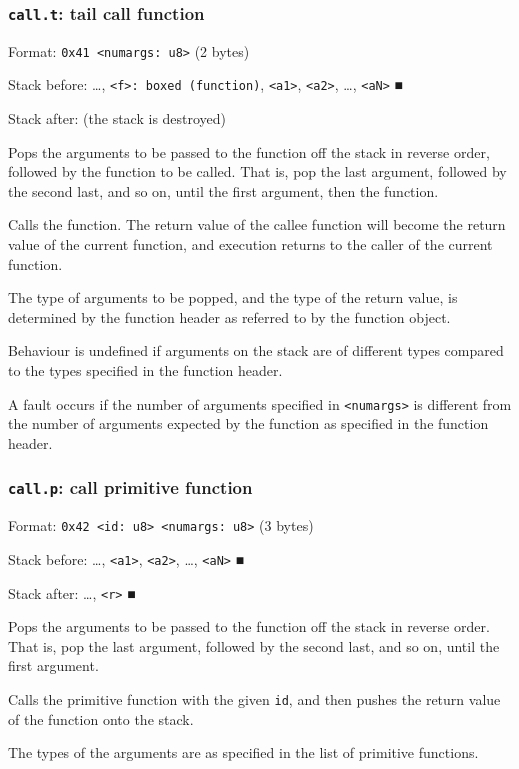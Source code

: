 \subsubsection{\texttt{call.t}: tail call function}
\label{sec:org026b562}
Format: \texttt{0x41 <numargs: u8>} (2 bytes)

Stack before: \ldots{}​, \texttt{<f>: boxed (function)}, \texttt{<a1>}, \texttt{<a2>}, \ldots{}​,
\texttt{<aN>} ■

Stack after: (the stack is destroyed)

Pops the arguments to be passed to the function off the stack in reverse
order, followed by the function to be called. That is, pop the last
argument, followed by the second last, and so on, until the first
argument, then the function.

Calls the function. The return value of the callee function will become
the return value of the current function, and execution returns to the
caller of the current function.

The type of arguments to be popped, and the type of the return value, is
determined by the function header as referred to by the function object.

Behaviour is undefined if arguments on the stack are of different types
compared to the types specified in the function header.

A fault occurs if the number of arguments specified in \texttt{<numargs>} is
different from the number of arguments expected by the function as
specified in the function header.

\subsubsection{\texttt{call.p}: call primitive function}
\label{sec:org99bb90f}
Format: \texttt{0x42 <id: u8> <numargs: u8>} (3 bytes)

Stack before: \ldots{}​, \texttt{<a1>}, \texttt{<a2>}, \ldots{}​, \texttt{<aN>} ■

Stack after: \ldots{}​, \texttt{<r>} ■

Pops the arguments to be passed to the function off the stack in reverse
order. That is, pop the last argument, followed by the second last, and
so on, until the first argument.

Calls the primitive function with the given \texttt{id}, and then pushes the
return value of the function onto the stack.

The types of the arguments are as specified in the list of primitive
functions.

